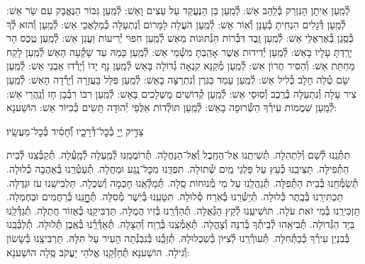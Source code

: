 \documentclass[twoside, openany, parskip=half, 11pt]{book}
\begin{document}
לְ֯מַֽעַן אֵיתָן הַנִּזְרַק בְּ֯לַֽהַב אֵשׁ: לְ֯מַֽעַן בֵּן הַנֶּעֱקַד עַל עֵצִים וָאֵשׁ: לְ֯מַֽעַן גִּבּוֹר הַנֶּאֱבַק עִם שַׂר אֵשׁ: לְ֯מַֽעַן דְּ֯גָלִים הִנְחִֽיתָ בְּ֯עָנָן וְ֯אוֹר אֵשׁ: לְ֯מַֽעַן הֹעֲלָה לַמָּרוֹם וְ֯נִתְעַלָּה כְּ֯מַלְאֲכֵי אֵשׁ: לְ֯מַֽעַן וְ֯הוּא לְ֯ךָ כְּ֯סֶֽגֶן בְּ֯אֶרְאֶלֵּי אֵשׁ: לְ֯מַֽעַן זֶֽבֶד דִּבְּ֯רוֹת הַנְּ֯תוּנוֹת מֵאֵשׁ לְ֯מַֽעַן חִפּוּי יְ֯רִיעוֹת וַעֲנַן אֵשׁ: לְ֯מַֽעַן טֶֽכֶס הָר יָרַֽדְתָּ עָלָיו בָּאֵשׁ: לְ֯מַֽעַן יְ֯דִידוּת אֲשֶׁר אָהַֽבְתָּ מִשְּׁ֯מֵי אֵשׁ: לְ֯מַֽעַן כָּמַהּ עַד שָׁקְ֯עָה הָאֵשׁ לְ֯מַֽעַן לָקַח מַחְתַּת אֵשׁ: וְ֯הֵסִיר חֲרוֹן אֵשׁ: לְ֯מַֽעַן מְ֯קַנֵּא קִנְאָה גְ֯דוֹלָה בָּאֵשׁ לְ֯מַֽעַן נָף יָדוֹ וְ֯יָרְ֯דוּ אַבְנֵי אֵשׁ: לְ֯מַֽעַן שָׂם טְ֯לֵה חָלָב כְּ֯לִיל אֵשׁ: לְ֯מַֽעַן עָמַד בַּגֹּֽרֶן וְ֯נִתְרַצָּה בָאֵשׁ: לְ֯מַֽעַן פִּלֵּל בָּעֲזָרָה וְ֯יָרְ֯דָה הָאֵשׁ: לְ֯מַֽעַן צִיר עָלָה וְ֯נִתְעַלָּה בְּ֯רֶֽכֶב וְ֯סֽוּסֵי אֵשׁ: לְ֯מַֽעַן קְ֯דוֹשִׁים מֻשְׁלָכִים בָּאֵשׁ: לְ֯מַֽעַן רִבּוֹ רִבְ֯בָן חָז וְ֯נַֽהֲרֵי אֵשׁ:
לְ֯מַֽעַן שִׁמֲמוֹת עִירְ֯ךָ הַשְּׂ֯רוּפָה בָאֵשׁ:
לְ֯מַֽעַן תּוֹלְ֯דוֹת אַלֻּפֵי יְ֯הוּדָה תָּשִׂים כְּ֯כִיּוֹר אֵשׁ: הוֹשַׁענָא:

צַדִּ֣יק יְ֖יָ בְּ֯כׇל־דְּ֯רָכָ֑יו וְ֯֝חָסִ֗יד בְּ֯כׇל־מַעֲשָֽׂיו׃

תִּתְּ֯נֵֽנוּ לְ֯שֵׁם וְ֯לִתְהִלָּה.
תְּ֯שִׁיתֵֽנוּ אֶל־הַחֶֽבֶל וְ֯אֶל־הַנַּחֲלָה.
תְּ֯רוֹמֲמֵֽנוּ לְ֯מַֽעְלָה לְ֯מָֽעְ֯לָה.
תְּ֯קַבְּ֯צֵֽנוּ לְ֯בֵית הַתְּ֯פִילָּה.
תַּצִּיבֵֽנוּ כְּ֯עֵץ עַל פַּלְגֵי מַֽיִם שְׁ֯תוּלָה.
תִּפְדֵּֽנוּ מִכׇּל־נֶֽגַע וּמַחֲלָה.
תְּ֯עַטְּ֯רֵֽנוּ בְּ֯אַהֲבָה כְ֯לוּלָה.
תְּ֯שַׂמְּ֯חֵֽנוּ בְּ֯בֵית הַתְּ֯פִלָּה.
תְּ֯נַהֲלֵֽנוּ עַל מֵי מְ֯נוּחוֹת סֶֽלָה.
תְּ֯מַלְּ֯אֵֽנוּ חׇכְמָה וְ֯שִׂכְלָה.
תַּלְבִּישֵֽׁנוּ עֹז וּגְדֻלָּה.
תַּכְתִּירֵֽנוּ בְּ֯כֶֽתֶר כְּ֯לוּלָה.
תְּ֯יַשְּׁ֯רֵֽנוּ בְּ֯אֹֽרַח סְ֯לוּלָה.
תִּטָּעֵֽנוּ בְּ֯יֹֽשֶׁר מְ֯סִלָּה.
תְּ֯חׇׇׇׇׇׇנֵּֽנוּ בְּ֯רַחֲמִים וּבְחֶמְלָה.
תַּזְכִּירֵֽנוּ בְּ֯מִי זֹאת עֹלָה.
תּוׂשִׁיעֵֽנוּ לְ֯קֵץ הַגְּ֯אֻלָּה.
תְּ֯הַדְּ֯רֵֽנוּ בְּ֯זִיו הֲמֻלָּה.
תַּדְבִּיקֵֽנוּ כְּ֯אֵזוֹר חֲתֻלָּה.
תְּ֯גַדְּ֯לֵֽנוּ בַּיָד הַגְּ֯דוׂלָה.
תְּ֯בִיאֵֽהוּ לְ֯בֵיתְ֯ךָ בְּ֯רִנָּה וְ֯צָהֳלָה.
תְּ֯אַמְּ֯צֵֽנוּ בְּ֯רֶֽוַח וְ֯הַצָּלָה.
תְּ֯אַדְּ֯רְֵ֯נוּ בְּ֯אֶֽבֶן תְּ֯לוּלָה.
תְּ֯לַבְּ֯בֵֽנוּ בְּ֯בִנְיַן עִירְ֯ךָ כְּ֯בַתְּ֯חִלָּה.
תְּ֯עוׂרְ֯רֵֽנוּ לְ֯צִיּוׂן בְּ֯שִׁכְלוּלָהּ.
תְּ֯זַכְֵּ֯נוּ בְּ֯נִבְנְ֯תָה הָעִיר עַל תִּלָּהּ.
תַּרְבִּיצֵֽנוּ בְּ֯שָׂשׂוֹן וְ֯גִילָה.
הוֹשַׁענָא תְּ֯חַזְּ֯קֵֽנוּ אֱלֹהֵי יַעֲקֹב סֶֽלָה הוֹשַׁענָא:
\end{document}
